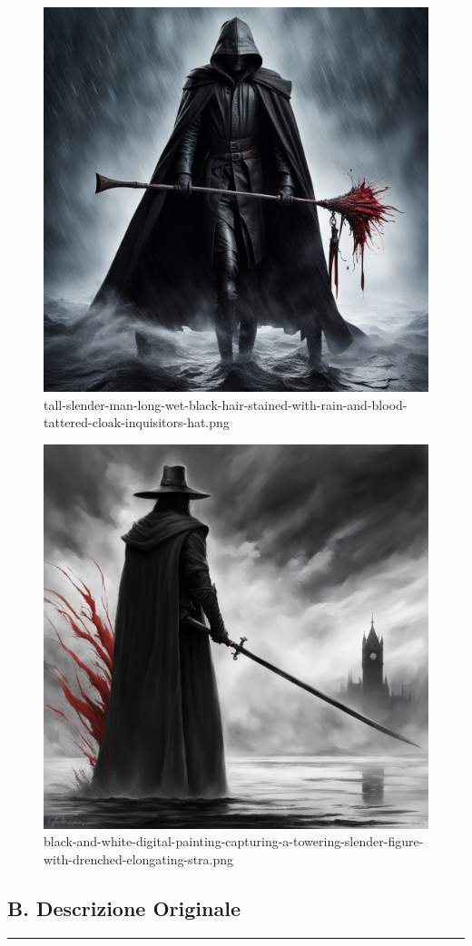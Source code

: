 \begin{figure}
\centering
\includegraphics{tall-slender-man-long-wet-black-hair-stained-with-rain-and-blood-tattered-cloak-inquisitors-hat.png}
\caption{tall-slender-man-long-wet-black-hair-stained-with-rain-and-blood-tattered-cloak-inquisitors-hat.png}
\end{figure}

\begin{figure}
\centering
\includegraphics{black-and-white-digital-painting-capturing-a-towering-slender-figure-with-drenched-elongating-stra.png}
\caption{black-and-white-digital-painting-capturing-a-towering-slender-figure-with-drenched-elongating-stra.png}
\end{figure}

\subsection{B. Descrizione Originale}\label{b.-descrizione-originale}

\begin{center}\rule{0.5\linewidth}{0.5pt}\end{center}

